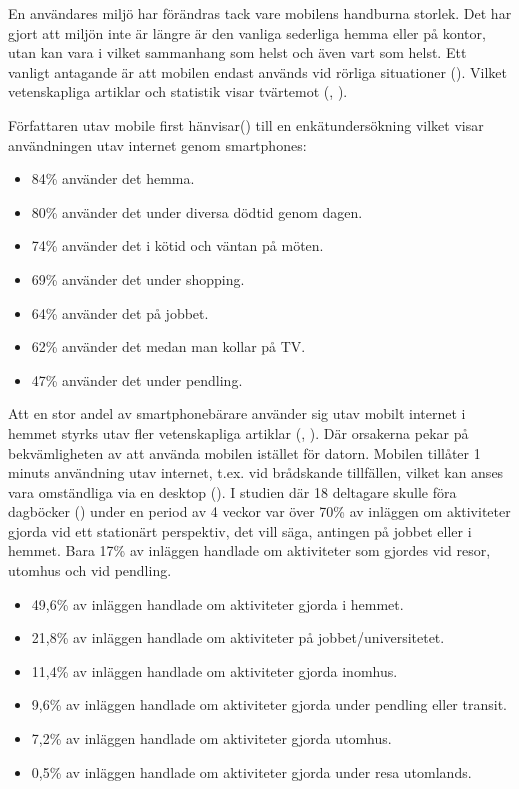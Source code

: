 \documentclass[11pt]{article}
\begin{document}
En användares miljö har förändras tack vare mobilens handburna storlek. Det har gjort att miljön inte är längre är den vanliga sederliga hemma eller på kontor, utan kan vara i vilket sammanhang som helst och även vart som helst. Ett vanligt antagande är att mobilen endast används vid rörliga situationer (\cite[s.12]{mobilefirstluke}). Vilket vetenskapliga artiklar och statistik visar tvärtemot (\cite{mobilewebsearch}, \cite{mobilefirstluke}).

Författaren utav mobile first hänvisar(\cite[s.12]{mobilefirstluke}) till en enkätundersökning vilket visar användningen utav internet genom smartphones:
\begin{itemize}
	\item{84\% använder det hemma.}
	\item{80\% använder det under diversa dödtid genom dagen.}
	\item{74\% använder det i kötid och väntan på möten.}
	\item{69\% använder det under shopping.}
	\item{64\% använder det på jobbet.}
	\item{62\% använder det medan man kollar på TV.}
	\item{47\% använder det under pendling.}
\end{itemize}
\bigskip

Att en stor andel av smartphonebärare använder sig utav mobilt internet i hemmet styrks utav fler vetenskapliga artiklar (\cite{mobilewebsearch}, \cite{mobilefirstluke}). Där orsakerna pekar på bekvämligheten av att använda mobilen istället för datorn. Mobilen tillåter 1 minuts användning utav internet, t.ex. vid brådskande tillfällen, vilket kan anses vara omständliga via en desktop (\cite{mobilewebsearch}). I studien där 18 deltagare skulle föra dagböcker (\cite{mobilewebsearch}) under en period av 4 veckor var över 70\% av inläggen om aktiviteter gjorda vid ett stationärt perspektiv, det vill säga, antingen på jobbet eller i hemmet. Bara 17\% av inläggen handlade om aktiviteter som gjordes vid resor, utomhus och vid pendling.
\\
\begin{itemize}
	\item{49,6\% av inläggen handlade om aktiviteter gjorda i hemmet.}
	\item{21,8\% av inläggen handlade om aktiviteter på jobbet/universitetet.}
	\item{11,4\% av inläggen handlade om aktiviteter gjorda inomhus.}
	\item{9,6\% av inläggen handlade om aktiviteter gjorda under pendling eller transit.}
	\item{7,2\% av inläggen handlade om aktiviteter gjorda utomhus.}
	\item{0,5\% av inläggen handlade om aktiviteter gjorda under resa utomlands.}
\end{itemize}
\bigskip
\end{document}
